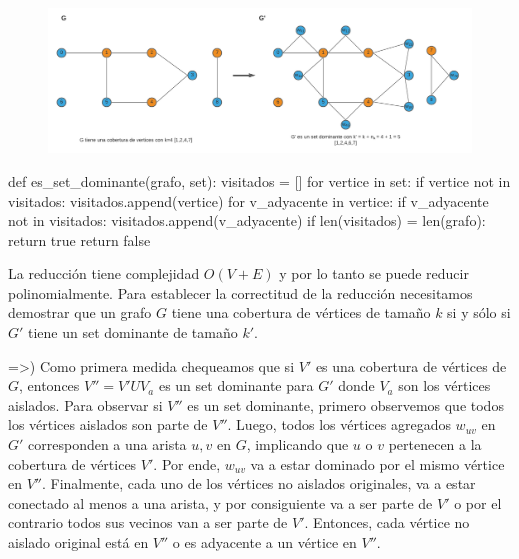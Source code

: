 \documentclass[../tp3_grupo404.tex]{subfiles}
\begin{document}
\begin{figure}[H]
    \centering
    \includegraphics[width=0.9\linewidth,angle=0,origin=c]{out/vertex_to_dominant.png}
\end{figure}

\begin{alternate}[breaklines=true,numbers=left,xleftmargin=5mm]
    def es_set_dominante(grafo, set):
    visitados = []
    for vertice in set:
        if vertice not in visitados:
            visitados.append(vertice)
        for v_adyacente in vertice:
            if v_adyacente not in visitados:
                visitados.append(v_adyacente)
    if len(visitados) = len(grafo):
        return true
    return false
\end{alternate}

La reducción tiene complejidad $O(V+E)$ y por lo tanto se puede reducir polinomialmente.
Para establecer la correctitud de la reducción necesitamos demostrar que un grafo $G$ tiene una cobertura 
de vértices de tamaño $k$ si y sólo si $G'$ tiene un set dominante de tamaño $k'$.

=>) Como primera medida chequeamos que si $V'$ es una cobertura de vértices de $G$, entonces $V''=V' U V_{a}$ es un 
set dominante para $G'$ donde $V_{a}$ son los vértices aislados.
Para observar si $V''$ es un set dominante, primero observemos que todos los vértices aislados son parte de $V''$. 
Luego, todos los vértices agregados $w_{uv}$ en $G'$ corresponden a una arista ${u,v}$ en $G$, implicando que $u$ o $v$ 
pertenecen a la cobertura de vértices $V'$. Por ende, $w_{uv}$ va a estar dominado por el mismo vértice en $V''$. 
Finalmente, cada uno de los vértices no aislados originales, va a estar conectado al menos a una arista, 
y por consiguiente va a ser parte de $V'$ o por el contrario todos sus vecinos van a ser parte de $V'$. 
Entonces, cada vértice no aislado original está en $V''$ o es adyacente a un vértice en $V''$.
\end{document}
